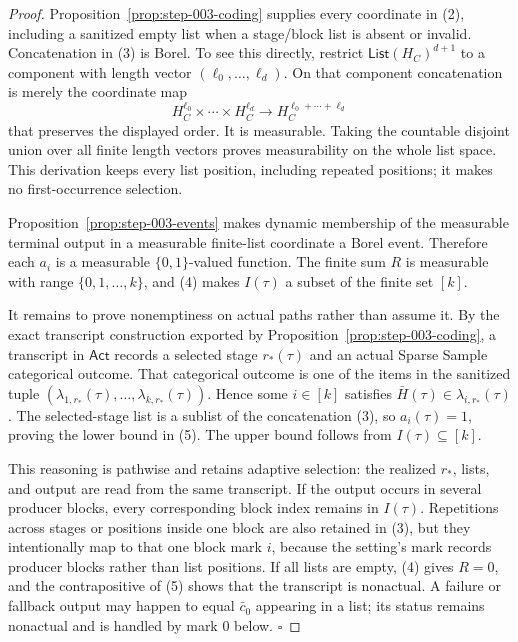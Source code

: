 \begin{proof}
Proposition~\ref{prop:step-003-coding} supplies every
coordinate in (2), including a sanitized empty list when a stage/block list
is absent or invalid. Concatenation in (3) is Borel. To see this directly,
restrict
\(\mathsf{List}(H_C)^{d+1}\) to a component with length vector
\((\ell_0,\ldots,\ell_d)\). On that component concatenation is merely the
coordinate map
\[
H_C^{\ell_0}\times\cdots\times H_C^{\ell_d}
\longrightarrow H_C^{\ell_0+\cdots+\ell_d}
\]
that preserves the displayed order. It is measurable. Taking the countable
disjoint union over all finite length vectors proves measurability on the
whole list space. This derivation keeps every list position, including
repeated positions; it makes no first-occurrence selection.

Proposition~\ref{prop:step-003-events} makes dynamic membership of
the measurable terminal output in a measurable finite-list coordinate a
Borel event. Therefore each \(a_i\) is a measurable
\(\{0,1\}\)-valued function. The finite sum \(R\) is measurable with range
\(\{0,1,\ldots,k\}\), and (4) makes \(I(\tau)\) a subset of the finite set
\([k]\).

It remains to prove nonemptiness on actual paths rather than assume it.
By the exact transcript construction exported by Proposition~\ref{prop:step-003-coding}, a transcript in
\(\mathsf{Act}\) records a selected stage \(r_*(\tau)\) and an actual
Sparse Sample categorical outcome. That categorical outcome is one of the
items in the sanitized tuple
\((\lambda_{1,r_*}(\tau),\ldots,
\lambda_{k,r_*}(\tau))\). Hence some \(i\in[k]\) satisfies
\(\bar H(\tau)\in\lambda_{i,r_*}(\tau)\). The selected-stage list is a
sublist of the concatenation (3), so \(a_i(\tau)=1\), proving the lower
bound in (5). The upper bound follows from \(I(\tau)\subseteq[k]\).

This reasoning is pathwise and retains adaptive selection: the realized
\(r_*\), lists, and output are read from the same transcript. If the output
occurs in several producer blocks, every corresponding block index remains
in \(I(\tau)\). Repetitions across stages or positions inside one block are
also retained in (3), but they intentionally map to that one block mark
\(i\), because the setting's mark records producer blocks rather than list
positions. If all lists are empty, (4) gives \(R=0\), and the contrapositive
of (5) shows that the transcript is nonactual. A failure or fallback output
may happen to equal \(\bar c_0\) appearing in a list; its status remains
nonactual and is handled by mark \(0\) below. \(\square\)


\end{proof}

